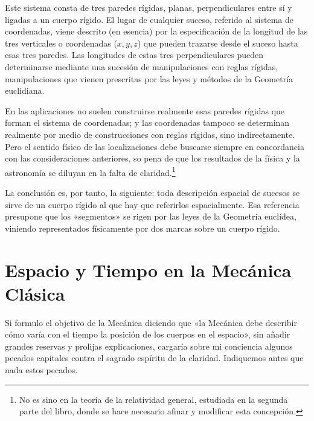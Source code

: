 \documentclass[spanish]{book}
\begin{document}
Este sistema consta de tres paredes rígidas, planas, perpendiculares entre sí y ligadas
a un cuerpo rígido. El lugar de cualquier suceso, referido al sistema de coordenadas,
viene descrito (en esencia) por la especificación de la longitud de las tres verticales o
coordenadas ($x, y, z$) que pueden trazarse desde el suceso hasta esas
tres paredes. Las longitudes de estas tres perpendiculares pueden determinarse
mediante una sucesión de manipulaciones con reglas rígidas, manipulaciones que
vienen prescritas por las leyes y métodos de la Geometría euclidiana.

En las aplicaciones no suelen construirse realmente esas paredes rígidas que forman
el sistema de coordenadas; y las coordenadas tampoco se determinan realmente por
medio de construcciones con reglas rígidas, sino indirectamente. Pero el sentido físico
de las localizaciones debe buscarse siempre en concordancia con las consideraciones
anteriores, so pena de que los resultados de la física y la astronomía se diluyan en la
falta de claridad.\footnote{No es sino en la teoría de la relatividad general, estudiada 
en la segunda parte del libro, donde se hace necesario afinar y modificar esta concepción.}

La conclusión es, por tanto, la siguiente: toda descripción espacial de sucesos se sirve
de un cuerpo rígido al que hay que referirlos espacialmente. Esa referencia presupone
que los «segmentos» se rigen por las leyes de la Geometría euclídea, viniendo
representados físicamente por dos marcas sobre un cuerpo rígido.


\chapter{Espacio y Tiempo en la Mecánica Clásica}

Si formulo el objetivo de la Mecánica diciendo que «la Mecánica debe describir
cómo varía con el tiempo la posición de los cuerpos en el espacio», sin añadir grandes
reservas y prolijas explicaciones, cargaría sobre mi conciencia algunos pecados
capitales contra el sagrado espíritu de la claridad. Indiquemos antes que nada estos
pecados.
\end{document}
